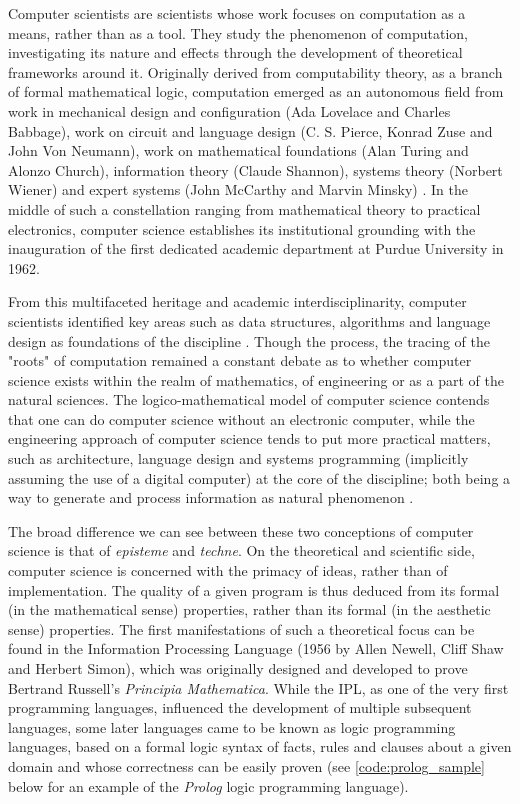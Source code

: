 Computer scientists are scientists whose work focuses on computation as a means, rather than as a tool. They study the phenomenon of computation, investigating its nature and effects through the development of theoretical frameworks around it. Originally derived from computability theory, as a branch of formal mathematical logic, computation emerged as an autonomous field from work in mechanical design and configuration (Ada Lovelace and Charles Babbage),  work on circuit and language design (C. S. Pierce, Konrad Zuse and John Von Neumann), work on mathematical foundations (Alan Turing and Alonzo Church), information theory (Claude Shannon), systems theory (Norbert Wiener) and expert systems (John McCarthy and Marvin Minsky) \citep{ifrah_universal_2001}. In the middle of such a constellation ranging from mathematical theory to practical electronics, computer science establishes its institutional grounding with the inauguration of the first dedicated academic department at Purdue University in 1962.

From this multifaceted heritage and academic interdisciplinarity, computer scientists identified key areas such as data structures, algorithms and language design as foundations of the discipline \citep{wirth_algorithms_1976}. Though the process, the tracing of the "roots" of computation remained a constant debate as to whether computer science exists within the realm of mathematics, of engineering or as a part of the natural sciences. The logico-mathematical model of computer science contends that one can do computer science without an electronic computer, while the engineering approach of computer science tends to put more practical matters, such as architecture, language design and systems programming (implicitly assuming the use of a digital computer) at the core of the discipline; both being a way to generate and process information as natural phenomenon \citep{tedre_development_2006}.

The broad difference we can see between these two conceptions of computer science is that of \emph{episteme} and \emph{techne}. On the theoretical and scientific side, computer science is concerned with the primacy of ideas, rather than of implementation. The quality of a given program is thus deduced from its formal (in the mathematical sense) properties, rather than its formal (in the aesthetic sense) properties. The first manifestations of such a theoretical focus can be found in the Information Processing Language (1956 by Allen Newell, Cliff Shaw and Herbert Simon), which was originally designed and developed to prove Bertrand Russell's \emph{Principia Mathematica}. While the IPL, as one of the very first programming languages, influenced the development of multiple subsequent languages, some later languages came to be known as logic programming languages, based on a formal logic syntax of facts, rules and clauses about a given domain and whose correctness can be easily proven (see \ref{code:prolog_sample} below for an example of the \emph{Prolog} logic programming language).

